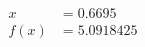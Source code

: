 \documentclass[preview]{standalone}
\begin{document}
\begin{align*}
x &= 0.6695\\f(x) &= 5.0918425
\end{align*}
\end{document}

